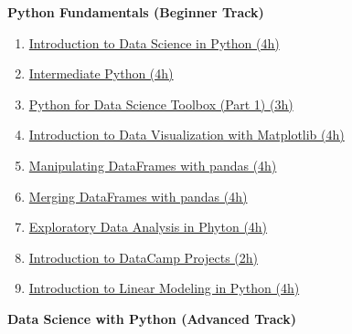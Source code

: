 \documentclass[
  11pt,
]{article}
\providecommand{\tightlist}{%
  \setlength{\itemsep}{0pt}\setlength{\parskip}{0pt}}
\newenvironment{tipsp}[1]
  {
  \begin{itemize}
  \footnotesize
  \renewcommand{\labelitemi}{
    \raisebox{-.7\height}[0pt][0pt]{
      {\setkeys{Gin}{width=3em,keepaspectratio}
        \texttt{[image: images/\#1.png]}}
    }
  }
  \setlength{\fboxsep}{1em}
  \begin{pbox}
  \item
  }
  {
  \end{pbox}
  \end{itemize}
  }
\begin{document}
\begin{tipsp}p

\textbf{Python Fundamentals (Beginner Track)}

\begin{enumerate}
\def\labelenumi{\arabic{enumi}.}
\tightlist
\item
  \href{https://www.datacamp.com/courses/introduction-to-data-science-in-python}{Introduction to Data Science in Python (4h)}
\item
  \href{https://www.datacamp.com/courses/intermediate-python-for-data-science}{Intermediate Python (4h)}
\item
  \href{https://www.datacamp.com/courses/python-data-science-toolbox-part-1}{Python for Data Science Toolbox (Part 1) (3h)}
\item
  \href{https://www.datacamp.com/courses/introduction-to-matplotlib}{Introduction to Data Visualization with Matplotlib (4h)}
\item
  \href{https://www.datacamp.com/courses/manipulating-dataframes-with-pandas}{Manipulating DataFrames with pandas (4h)}
\item
  \href{https://www.datacamp.com/courses/merging-dataframes-with-pandas}{Merging DataFrames with pandas (4h)}
\item
  \href{https://www.datacamp.com/courses/exploratory-data-analysis-in-python}{Exploratory Data Analysis in Phyton (4h)}
\item
  \href{https://www.datacamp.com/projects/33}{Introduction to DataCamp Projects (2h)}
\item
  \href{https://www.datacamp.com/courses/introduction-to-linear-modeling-in-python}{Introduction to Linear Modeling in Python (4h)}
\end{enumerate}

\textbf{Data Science with Python (Advanced Track)}


\end{tipsp}
\end{document}
